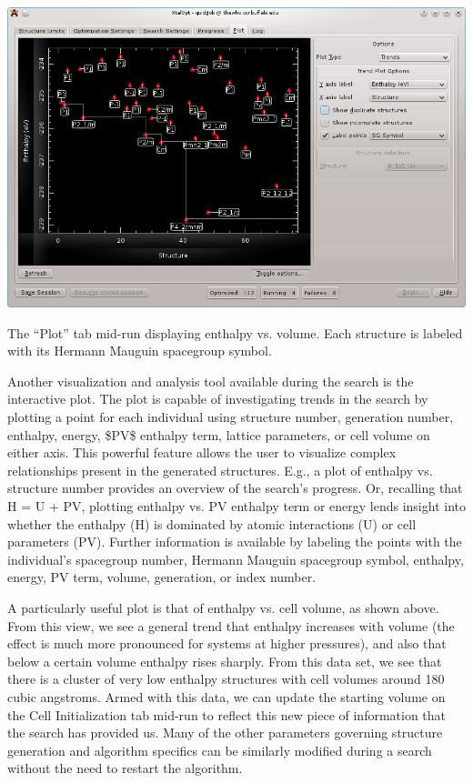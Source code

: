 \begin{DoxyImage}
\includegraphics[width=\textwidth]{trend-view.png}
\caption{The ``\-Plot'' tab mid-\/run displaying enthalpy vs. volume. Each structure is labeled with its Hermann Mauguin spacegroup symbol.}
\end{DoxyImage}


Another visualization and analysis tool available during the search is the interactive plot. The plot is capable of investigating trends in the search by plotting a point for each individual using structure number, generation number, enthalpy, energy, \$\-P\-V\$ enthalpy term, lattice parameters, or cell volume on either axis. This powerful feature allows the user to visualize complex relationships present in the generated structures. E.\-g., a plot of enthalpy vs. structure number provides an overview of the search's progress. Or, recalling that H = U + P\-V, plotting enthalpy vs. P\-V enthalpy term or energy lends insight into whether the enthalpy (H) is dominated by atomic interactions (U) or cell parameters (P\-V). Further information is available by labeling the points with the individual's spacegroup number, Hermann Mauguin spacegroup symbol, enthalpy, energy, P\-V term, volume, generation, or index number.

A particularly useful plot is that of enthalpy vs. cell volume, as shown above. From this view, we see a general trend that enthalpy increases with volume (the effect is much more pronounced for systems at higher pressures), and also that below a certain volume enthalpy rises sharply. From this data set, we see that there is a cluster of very low enthalpy structures with cell volumes around 180 cubic angstroms. Armed with this data, we can update the starting volume on the Cell Initialization tab mid-\/run to reflect this new piece of information that the search has provided us. Many of the other parameters governing structure generation and algorithm specifics can be similarly modified during a search without the need to restart the algorithm.

